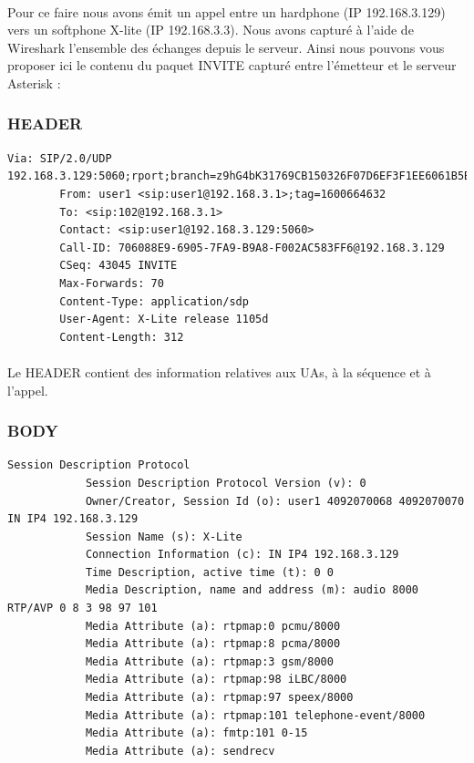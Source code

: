 \documentclass[12pt,a4paper,notitlepage]{article}
\begin{document}
\paragraph{}Pour ce faire nous avons émit un appel entre un hardphone (IP 192.168.3.129) vers un softphone X-lite (IP 192.168.3.3). Nous avons capturé à l'aide de Wireshark l'ensemble des échanges depuis le serveur. Ainsi nous pouvons vous proposer ici le contenu du paquet INVITE capturé entre l'émetteur et le serveur Asterisk :
\subsubsection{HEADER}
\begin{lstlisting}[title=Contenu du HEADER d'un paquet INVITE de SIP]
 Via: SIP/2.0/UDP 192.168.3.129:5060;rport;branch=z9hG4bK31769CB150326F07D6EF3F1EE6061B5B
        From: user1 <sip:user1@192.168.3.1>;tag=1600664632
        To: <sip:102@192.168.3.1>
        Contact: <sip:user1@192.168.3.129:5060>
        Call-ID: 706088E9-6905-7FA9-B9A8-F002AC583FF6@192.168.3.129
        CSeq: 43045 INVITE
        Max-Forwards: 70
        Content-Type: application/sdp
        User-Agent: X-Lite release 1105d
        Content-Length: 312
\end{lstlisting}
\paragraph{}Le HEADER contient des information relatives aux UAs, à la séquence et à l'appel.
\subsubsection{BODY}
\begin{lstlisting}[title=Contenu du BODY d'un paquet INVITE de SIP]
Session Description Protocol
            Session Description Protocol Version (v): 0
            Owner/Creator, Session Id (o): user1 4092070068 4092070070 IN IP4 192.168.3.129
            Session Name (s): X-Lite
            Connection Information (c): IN IP4 192.168.3.129
            Time Description, active time (t): 0 0
            Media Description, name and address (m): audio 8000 RTP/AVP 0 8 3 98 97 101
            Media Attribute (a): rtpmap:0 pcmu/8000
            Media Attribute (a): rtpmap:8 pcma/8000
            Media Attribute (a): rtpmap:3 gsm/8000
            Media Attribute (a): rtpmap:98 iLBC/8000
            Media Attribute (a): rtpmap:97 speex/8000
            Media Attribute (a): rtpmap:101 telephone-event/8000
            Media Attribute (a): fmtp:101 0-15
            Media Attribute (a): sendrecv
\end{lstlisting}
\end{document}

